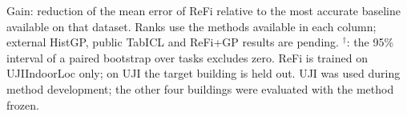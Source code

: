 \begin{table}[t]
\begin{tabular}{lrrrrrrrrrrr}
\bottomrule
\end{tabular}\par\smallskip
\begin{minipage}{0.98\textwidth}\footnotesize Gain: reduction of the mean error of ReFi relative to the most accurate baseline available on that dataset. Ranks use the methods available in each column; external HistGP, public TabICL and ReFi+GP results are pending. $^\dagger$: the 95\% interval of a paired bootstrap over tasks excludes zero. ReFi is trained on UJIIndoorLoc only; on UJI the target building is held out. UJI was used during method development; the other four buildings were evaluated with the method frozen.\end{minipage}
\end{table}

